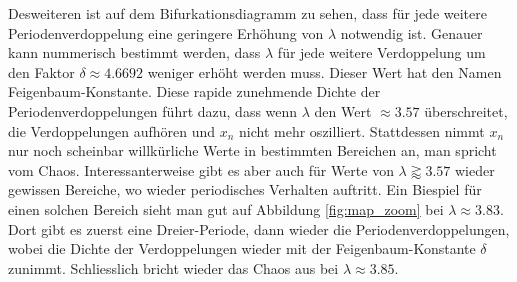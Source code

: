 Desweiteren ist auf dem Bifurkationsdiagramm zu sehen,
dass für jede weitere Periodenverdoppelung eine geringere
Erhöhung von $\lambda$ notwendig ist.
Genauer kann nummerisch bestimmt werden, 
dass $\lambda$ für jede weitere Verdoppelung um
den Faktor $\delta \approx 4.6692$ weniger erhöht werden muss.
Dieser Wert hat den Namen Feigenbaum-Konstante.
Diese rapide zunehmende Dichte der Periodenverdoppelungen führt dazu, 
dass wenn $\lambda$ den Wert $\approx 3.57$ überschreitet, 
die Verdoppelungen aufhören und $x_n$ nicht mehr oszilliert. 
Stattdessen nimmt $x_n$ nur noch scheinbar 
willkürliche Werte in bestimmten Bereichen an, 
man spricht vom Chaos.
Interessanterweise gibt es aber auch für Werte von 
$\lambda \gtrapprox 3.57$ wieder gewissen Bereiche,
wo wieder periodisches Verhalten auftritt. 
Ein Biespiel für einen solchen Bereich sieht man
gut auf Abbildung \ref{fig:map_zoom} bei 
$\lambda \approx 3.83$. 
Dort gibt es zuerst eine Dreier-Periode, 
dann wieder die Periodenverdoppelungen, 
wobei die Dichte der Verdoppelungen
wieder mit der Feigenbaum-Konstante $\delta$ zunimmt.
Schliesslich bricht wieder das Chaos aus bei 
$\lambda \approx 3.85$.
